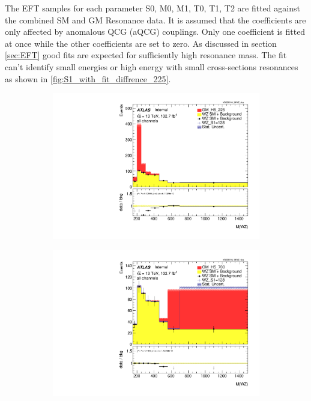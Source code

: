 \documentclass[../Bachelorarbeit.tex]{subfiles}
\begin{document}
The EFT samples for each parameter S0, M0, M1, T0, T1, T2 are fitted against the combined SM and GM Resonance data. It is assumed that the coefficients are only affected by anomalous QCG (aQCG) couplings.
Only one coefficient is fitted at once while the other coefficients are set to zero. As discussed in section \ref{sec:EFT} good fits are expected for sufficiently high resonance mass.
The fit can't identify small energies or high energy with small cross-sections resonances as shown in \ref{fig:S1_with_fit_diffrence_225}.

\begin{figure}[h]
    \centering
    \begin{subfigure}{0.3\textwidth}
        \includegraphics[width=\textwidth]{Plots/operators/all_VV_MTWZ_vbs_225.pdf}
        \caption{}
    \end{subfigure}
    \begin{subfigure}{0.3\textwidth}
        \includegraphics[width=\textwidth]{Plots/operators/all_VV_MTWZ_vbs_700.pdf}

\end{subfigure}
\end{figure}
\end{document}
